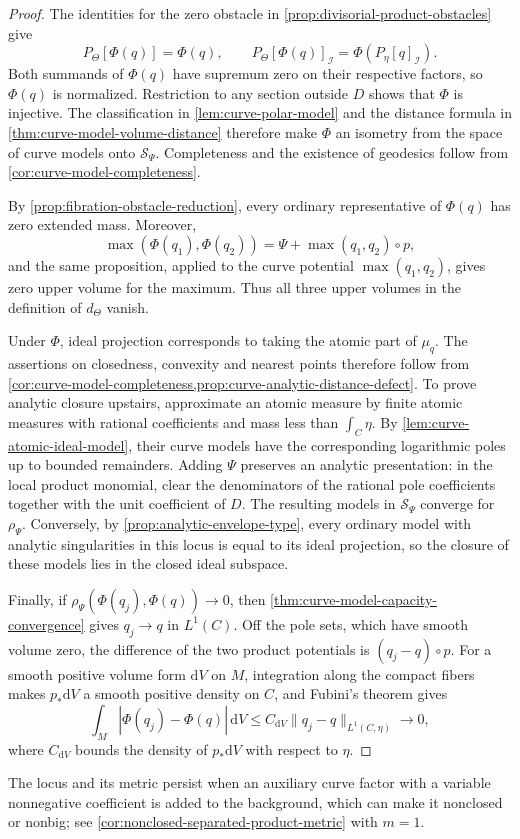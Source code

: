 \begin{proof}
The identities for the zero obstacle in \cref{prop:divisorial-product-obstacles} give
\[
 P_\Theta[\Phi(q)]=\Phi(q),\qquad
 P_\Theta[\Phi(q)]_{\mathcal I}
       =\Phi(P_\eta[q]_{\mathcal I}).
\]
Both summands of $\Phi(q)$ have supremum zero on their respective factors, so $\Phi(q)$ is normalized. Restriction to any section outside $D$ shows that $\Phi$ is injective. The classification in \cref{lem:curve-polar-model} and the distance formula in \cref{thm:curve-model-volume-distance} therefore make $\Phi$ an isometry from the space of curve models onto $\mathcal S_\Psi$. Completeness and the existence of geodesics follow from \cref{cor:curve-model-completeness}.

By \cref{prop:fibration-obstacle-reduction}, every ordinary representative of $\Phi(q)$ has zero extended mass. Moreover,
\[
 \max(\Phi(q_1),\Phi(q_2))
       =\Psi+\max(q_1,q_2)\circ p,
\]
and the same proposition, applied to the curve potential $\max(q_1,q_2)$, gives zero upper volume for the maximum. Thus all three upper volumes in the definition of $d_\Theta$ vanish.

Under $\Phi$, ideal projection corresponds to taking the atomic part of $\mu_q$. The assertions on closedness, convexity and nearest points therefore follow from \cref{cor:curve-model-completeness,prop:curve-analytic-distance-defect}. To prove analytic closure upstairs, approximate an atomic measure by finite atomic measures with rational coefficients and mass less than $\int_C\eta$. By \cref{lem:curve-atomic-ideal-model}, their curve models have the corresponding logarithmic poles up to bounded remainders. Adding $\Psi$ preserves an analytic presentation: in the local product monomial, clear the denominators of the rational pole coefficients together with the unit coefficient of $D$. The resulting models in $\mathcal S_\Psi$ converge for $\rho_\Psi$. Conversely, by \cref{prop:analytic-envelope-type}, every ordinary model with analytic singularities in this locus is equal to its ideal projection, so the closure of these models lies in the closed ideal subspace.

Finally, if $\rho_\Psi(\Phi(q_j),\Phi(q))\to0$, then \cref{thm:curve-model-capacity-convergence} gives $q_j\to q$ in $L^1(C)$. Off the pole sets, which have smooth volume zero, the difference of the two product potentials is $(q_j-q)\circ p$. For a smooth positive volume form $\mathrm dV$ on $M$, integration along the compact fibers makes $p_*\mathrm dV$ a smooth positive density on $C$, and Fubini's theorem gives
\[
 \int_M|\Phi(q_j)-\Phi(q)|\,\mathrm dV
       \leq C_{\mathrm dV}\|q_j-q\|_{L^1(C,\eta)}\longrightarrow0,
\]
where $C_{\mathrm dV}$ bounds the density of $p_*\mathrm dV$ with respect to $\eta$.
\end{proof}

The locus and its metric persist when an auxiliary curve factor with a variable nonnegative coefficient is added to the background, which can make it nonclosed or nonbig; see \cref{cor:nonclosed-separated-product-metric} with $m=1$.
